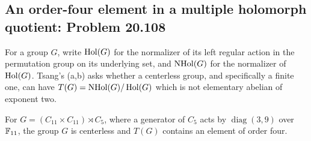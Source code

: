 \subsection{An order-four element in a multiple holomorph quotient: Problem 20.108}
\label{subsec:holomorph}

For a group $G$, write $\operatorname{Hol}(G)$ for the normalizer of its
left regular action in the permutation group on its underlying
set, and $\operatorname{NHol}(G)$ for the normalizer of $\operatorname{Hol}(G)$.
Tsang's (a,b) asks whether a centerless group,
and specifically a finite one, can have
$T(G)=\operatorname{NHol}(G)/\operatorname{Hol}(G)$ which is not elementary abelian of
exponent two.

\begin{theorem}
\label{thm:holomorph}
For $G=(C_{11}\times C_{11})\rtimes C_5$, where a generator
of $C_5$ acts by $\operatorname{diag}(3,9)$ over $\mathbb F_{11}$,
the group $G$ is centerless and $T(G)$ contains an element
of order four.
\end{theorem}

